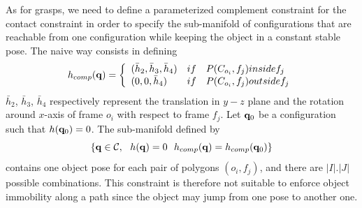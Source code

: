 As for grasps, we need to define a parameterized complement constraint for the contact constraint in order to specify the sub-manifold of configurations that are reachable from one configuration while keeping the object in a constant stable pose. The naive way consists in defining
$$
h_{comp}(\mathbf{q}) = \left\{\begin{array}{lll}(\bar{h}_2,\bar{h}_3,\bar{h}_4)&
\relax{if} & P(C_{o_i},f_j)\relax{ inside } f_j\\
(0,0,\bar{h}_4)&
\relax{if} & P(C_{o_i},f_j)\relax{ outside } f_j\end{array}\right.
$$
$\bar{h}_2$, $\bar{h}_3$, $\bar{h}_4$ respectively represent the translation in $y-z$ plane and the rotation around $x$-axis of frame $o_i$ with respect to frame $f_j$. Let $\mathbf{q}_0$ be a configuration such that $h(\mathbf{q}_0)=0$. The sub-manifold defined by
\begin{equation}\label{eq:stable-pose}
\left\{\conf\in\CS,\ \ h(\conf)=0\ \ h_{comp}(\conf) = h_{comp}(\conf_0) \right\}
\end{equation}
contains one object pose for each pair of polygons $(o_i,f_j)$, and there are
$|I| . |J|$ possible combinations. This constraint is therefore not suitable to
enforce object immobility along a path since the object may jump from one pose to another one.

